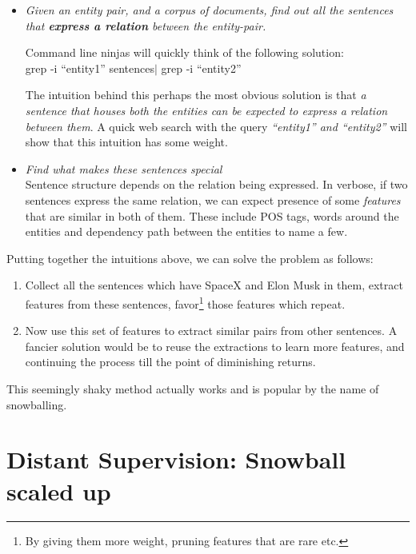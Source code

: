 \documentclass[a4paper,10pt]{article}
\begin{document}
\begin{itemize}
 
\item \emph{Given an entity pair, and a corpus of documents, find out all the sentences that
\textbf{express a relation} between the entity-pair.}

Command line ninjas will quickly think of the following solution:\\
grep -i ``entity1'' sentences$\vert$ grep -i ``entity2''

The intuition behind this perhaps the most obvious solution is that \emph{a sentence
that houses both the entities can be expected to express a relation between them}.
A quick web search with the query \emph{``entity1'' and ``entity2''} will show that this 
intuition has some weight.

\item \emph{Find what makes these sentences special} \\
Sentence structure depends on the relation being expressed.
In verbose, if two sentences express the same relation, we can expect presence of some 
 \emph{features} that are similar in both of them. These include POS tags, words around the entities and
dependency path between the entities to name a few.

\end{itemize}
Putting together the intuitions above, we can solve the problem as follows:
\begin{enumerate}
 \item Collect all the sentences which have SpaceX and Elon Musk in them, extract features 
from these sentences, favor\footnote{By giving them more weight, pruning features that are rare etc.} those features which repeat.
\item Now use this set of features to extract similar pairs from other sentences.
A fancier solution would be to reuse the extractions to learn more features, and continuing the process 
till the point of diminishing returns.
\end{enumerate}



This seemingly shaky method actually works \cite{snowball} and is popular by the name of snowballing.

\section{Distant Supervision: Snowball scaled up}
\label{ds}
\end{document}
